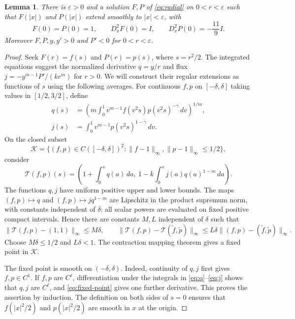 \documentclass[11pt]{article}
\newtheorem{lemma}[theorem]{Lemma}
\theoremstyle{remark}
\begin{document}
\begin{lemma}\label{lem:local}
There is $\varepsilon>0$ and a solution $F,P$ of
\eqref{eq:radial} on $0<r<\varepsilon$ such that
$F(|x|)$ and $P(|x|)$ extend smoothly to $|x|<\varepsilon$,
with
\[
 F(0)=P(0)=1,\qquad D_x^2F(0)=I,\qquad
 D_x^2P(0)=-\frac{11}{9}I.
\]
Moreover $F,P,y,y'>0$ and $P'<0$ for $0<r<\varepsilon$.
\end{lemma}
\begin{proof}
Seek $F(r)=f(s)$ and $P(r)=p(s)$, where $s=r^2/2$.
The integrated equations suggest the normalized derivative
$q=y/r$ and flux $j=-y^{m-1}P'/(kr^m)$ for $r>0$.
We will construct their regular extensions as functions of $s$
using the following averages.
For continuous $f,p$ on $[-\delta,\delta]$ taking values in
$[1/2,3/2]$, define
\begin{align}
 q(s)&=\left(m\int_0^1 v^{m-1}
                  f(v^2s)p(v^2s)^{-\gamma}\,dv\right)^{1/m},
                  \label{eq:q}\\
 j(s)&=\int_0^1 v^{m-1}p(v^2s)^{1-\gamma}\,dv.
                  \label{eq:j}
\end{align}
On the closed subset
\[
 \mathcal K=\{(f,p)\in C([-\delta,\delta])^2:
          \|f-1\|_\infty,\|p-1\|_\infty\leq1/2\},
\]
consider
\begin{equation}\label{eq:fixed-point}
 \mathcal T(f,p)(s)=
 \left(1+\int_0^s q(a)\,da,
       \ 1-k\int_0^s j(a)q(a)^{1-m}\,da\right).
\end{equation}
The functions $q,j$ have uniform positive upper and lower bounds.
The maps $(f,p)\mapsto q$ and $(f,p)\mapsto jq^{1-m}$ are
Lipschitz in the product supremum norm, with constants independent
of $\delta$: all scalar powers are evaluated on fixed positive
compact intervals.  Hence there are constants $M,L$ independent
of $\delta$ such that
\[
 \|\mathcal T(f,p)-(1,1)\|_\infty\leq M\delta,
 \qquad
 \|\mathcal T(f,p)-\mathcal T(\widetilde f,\widetilde p)\|_\infty
 \leq L\delta\|(f,p)-(\widetilde f,\widetilde p)\|_\infty.
\]
Choose $M\delta\leq1/2$ and $L\delta<1$.
The contraction mapping theorem gives a fixed point in $\mathcal K$.

The fixed point is smooth on $(-\delta,\delta)$.
Indeed, continuity of $q,j$ first gives $f,p\in C^1$.
If $f,p$ are $C^\ell$, differentiation under the integrals in
\eqref{eq:q}--\eqref{eq:j} shows that $q,j$ are $C^\ell$,
and \eqref{eq:fixed-point} gives one further derivative.
This proves the assertion by induction.  The definition on both
sides of $s=0$ ensures that $f(|x|^2/2)$ and $p(|x|^2/2)$
are smooth in $x$ at the origin.


\end{proof}
\end{document}
